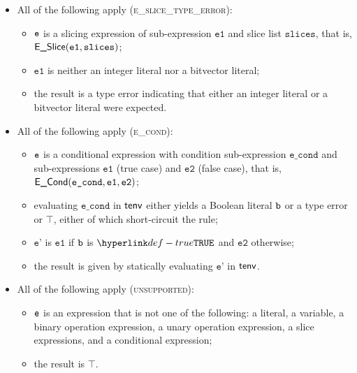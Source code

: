 \documentclass{book}
\newcommand\UnsupportedExpression[0]{\top}
\newcommand\veone[0]{\texttt{e1}}
\newcommand\vetwo[0]{\texttt{e2}}
\newcommand\vslices[0]{\texttt{slices}}
\newcommand\econd[0]{\texttt{e\_cond}}
\newcommand\vep[0]{\texttt{e'}}
\begin{document}
\begin{itemize}
  \item All of the following apply (\textsc{e\_slice\_type\_error}):
  \begin{itemize}
    \item $\texttt{e}$ is a slicing expression of sub-expression $\veone$ and slice list $\vslices$, that is, $\ESlice(\veone, \vslices)$;
    \item $\veone$ is neither an integer literal nor a bitvector literal;
    \item the result is a type error indicating that either an integer literal or a bitvector literal were expected.
  \end{itemize}

  \item All of the following apply (\textsc{e\_cond}):
  \begin{itemize}
    \item $\texttt{e}$ is a conditional expression with condition sub-expression $\econd$ and sub-expressions $\veone$ (true case)
          and $\vetwo$ (false case), that is, $\ECond(\econd, \veone, \vetwo)$;
    \item evaluating $\econd$ in $\textsf{tenv}$ either yields a Boolean literal $\texttt{b}$ or a type error or $\UnsupportedExpression$,
          either of which short-circuit the rule;
    \item $\vep$ is $\veone$ if $\texttt{b}$ is $\True$ and $\vetwo$ otherwise;
    \item the result is given by statically evaluating $\vep$ in $\textsf{tenv}$.
  \end{itemize}

  \item All of the following apply (\textsc{unsupported}):
  \begin{itemize}
    \item $\texttt{e}$ is an expression that is not one of the following: a literal, a variable, a binary operation expression,
          a unary operation expression, a slice expressions, and a conditional expression;
    \item the result is $\UnsupportedExpression$.
  \end{itemize}
\end{itemize}
\end{document}

